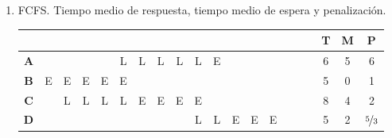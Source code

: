 \begin{ejercicio}
    \begin{enumerate}
        \item FCFS. Tiempo medio de respuesta, tiempo medio de espera y penalización.
        \begin{table}[H]
            \begin{tabular}{ccccccccccccccccc|ccc}
                                            &                        &                       &                       &                       &                       &                        &                       &                       &                       &                       &                         &                       &                       &                       &                       &    & \textbf{T} & \textbf{M} & \textbf{P} \\ \hline
            \multicolumn{1}{c|}{\textbf{A}} &                        &                       &                       &                       & L                     & L                      & L                     & L                     & L                     & E                     &                         &                       &                       &                       &                       &    & 6          & 5          & 6          \\ \hline
            \multicolumn{1}{c|}{\textbf{B}} & E                      & E                     & E                     & E                     & E                     &                        &                       &                       &                       &                       &                         &                       &                       &                       &                       &    & 5          & 0          & 1          \\ \hline
            \multicolumn{1}{c|}{\textbf{C}} &                        & L                     & L                     & L                     & L                     & E                      & E                     & E                     & E                     &                       &                         &                       &                       &                       &                       &    & 8          & 4          & 2          \\ \hline
            \multicolumn{1}{c|}{\textbf{D}} &                        &                       &                       &                       &                       &                        &                       &                       & L                     & L                     & E                       & E                     & E                     &                       &                       &    & 5          & 2          & $\nicefrac{5}{3}$        \\ \hline

\end{tabular}
\end{table}
\end{enumerate}
\end{ejercicio}
